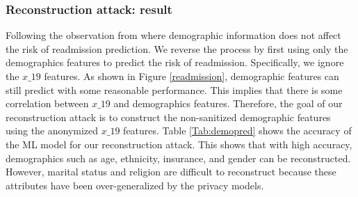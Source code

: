 \documentclass{bioinfo}
\begin{document}
\subsubsection{Reconstruction attack: result}
Following the observation from \citet{tang2018predictive} where demographic information does not affect the risk of readmission prediction. We reverse the process by first using only the demographics features to predict the risk of readmission. Specifically, we ignore the $x\_19$ features. As shown in Figure \ref{readmission}, demographic features can still predict with some reasonable performance. This implies that there is some correlation between $x\_19$ and demographics features. Therefore, the goal of our reconstruction attack is to construct the non-sanitized demographic features using the anonymized $x\_19$ features.
Table \ref{Tab:demopred} shows the accuracy of the ML model for our reconstruction attack. This shows that with high accuracy, demographics such as age, ethnicity, insurance, and gender can be reconstructed. However, marital status and religion are difficult to reconstruct because these attributes have been over-generalized by the privacy models.
\end{document}
